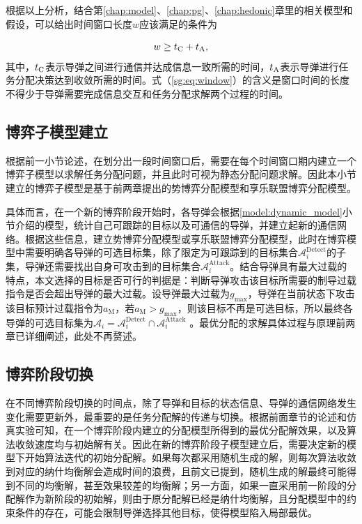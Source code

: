 根据以上分析，结合第\ref{chap:model}、\ref{chap:pg}、\ref{chap:hedonic}章里的相关模型和假设，可以给出时间窗口长度$w$应该满足的条件为

\begin{equation}
\label{sg:eq:window}
	w \geq t_{\text C} + t_{\text A},
\end{equation}
其中，$t_{\text C}$表示导弹之间进行通信并达成信息一致所需的时间，$t_{\text A}$表示导弹进行任务分配决策达到收敛所需的时间。式（\ref{sg:eq:window}）的含义是窗口时间的长度不得少于导弹需要完成信息交互和任务分配求解两个过程的时间。

\subsection{博弈子模型建立}
\label{game_stage:submodel}

根据前一小节论述，在划分出一段时间窗口后，需要在每个时间窗口期内建立一个博弈子模型以求解任务分配问题，并且此时可视为静态分配问题求解。因此本小节建立的博弈子模型是基于前两章提出的势博弈分配模型和享乐联盟博弈分配模型。

具体而言，在一个新的博弈阶段开始时，各导弹会根据\ref{model:dynamic_model}小节介绍的模型，统计自己可跟踪的目标以及可通信的导弹，并建立起新的通信网络。根据这些信息，建立势博弈分配模型或享乐联盟博弈分配模型，此时在博弈模型中需要明确各导弹的可选目标集，除了限定为可跟踪到的目标集合$\mathcal{A}^{\text{Detect}}_i$的子集，导弹还需要找出自身可攻击到的目标集合$\mathcal{A}^{\text{Attack}}_i$。结合导弹具有最大过载的特点，本文选择的目标是否可行的判据是：判断导弹攻击该目标所需要的制导过载指令是否会超出导弹的最大过载。设导弹最大过载为$g_{\text{max}}$，导弹在当前状态下攻击该目标预计过载指令为$a_{\text{M}}$，若$a_{\text{M}}>g_{\text{max}}$，则该目标不再是可选目标，所以最终各导弹的可选目标集为$\mathcal{A}_i = \mathcal{A}^{\text{Detect}}_i \cap \mathcal{A}^{\text{Attack}}_i$
。最优分配的求解具体过程与原理前两章已详细阐述，此处不再赘述。

\subsection{博弈阶段切换}
\label{game_stage:stage_transform}

在不同博弈阶段切换的时间点，除了导弹和目标的状态信息、导弹的通信网络发生变化需要更新外，最重要的是任务分配解的传递与切换。根据前面章节的论述和仿真实验可知，在一个博弈阶段内建立的分配模型所得到的最优分配解效果，以及算法收敛速度均与初始解有关。因此在新的博弈阶段子模型建立后，需要决定新的模型下开始算法迭代的初始分配解。如果每次都采用随机生成的解，则每次算法收敛到对应的纳什均衡解会造成时间的浪费，且前文已提到，随机生成的解最终可能得到不同的均衡解，甚至效果较差的均衡解；另一方面，如果一直采用前一阶段的分配解作为新阶段的初始解，则由于原分配解已经是纳什均衡解，且分配模型中的约束条件的存在，可能会限制导弹选择其他目标，使得模型陷入局部最优。


